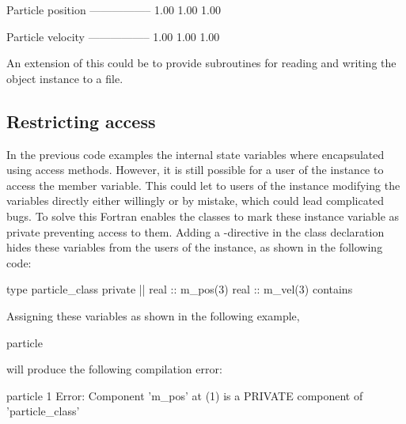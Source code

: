\cmdmode

\begin{fortrancodeenv}
 Particle position
 -----------------
  1.00      1.00      1.00

 Particle velocity
 -----------------
  1.00      1.00      1.00
\end{fortrancodeenv}

An extension of this could be to provide subroutines for reading and writing the object instance to a file.

\subsection{Restricting access}

In the previous code examples the internal state variables where encapsulated using access methods. However, it is still possible for a user of the instance to access the member variable. This could let to users of the instance modifying the variables directly either willingly or by mistake, which could lead complicated bugs. To solve this Fortran enables the classes to mark these instance variable as private preventing access to them. Adding a -directive in the class declaration hides these variables from the users of the instance, as shown in the following code:

\fmode

\begin{fortrancodeenv}
type particle_class
private |\hladded|
    real :: m_pos(3)
    real :: m_vel(3)
contains
\end{fortrancodeenv}

Assigning these variables as shown in the following example,

\begin{fortrancodeenv}
particle %
\end{fortrancodeenv}

will produce the following compilation error:

\cmdmode

\begin{fortrancodeenv}
    particle %
                  1
Error: Component 'm_pos' at (1) is a PRIVATE component of 'particle_class'
\end{fortrancodeenv}

\fmode

